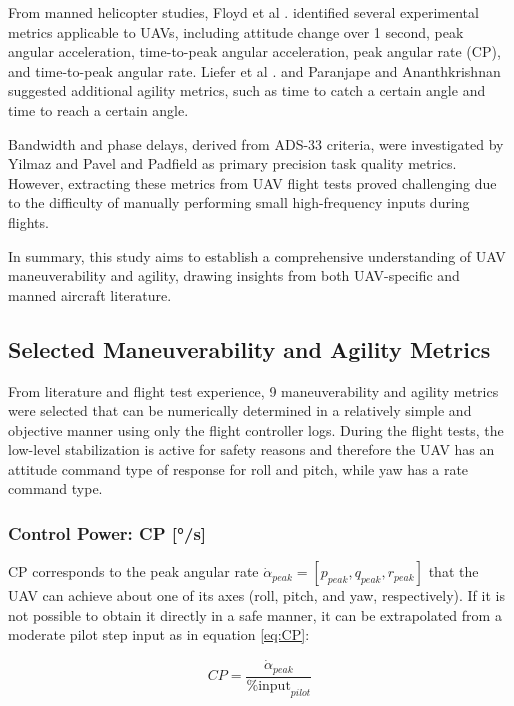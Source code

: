 From manned helicopter studies, Floyd et al \cite{Floyd1975}. identified several experimental metrics applicable to UAVs, including attitude change over 1 second, peak angular acceleration, time-to-peak angular acceleration, peak angular rate (CP), and time-to-peak angular rate. Liefer et al \cite{Liefer1992}. and Paranjape \cite{Paranjape2006} and Ananthkrishnan \cite{Paranjape2006} suggested additional agility metrics, such as time to catch a certain angle and time to reach a certain angle.

Bandwidth and phase delays, derived from ADS-33 criteria, were investigated by Yilmaz and Pavel \cite{Yilmaz2009} and Padfield \cite{Padfield2007} as primary precision task quality metrics. However, extracting these metrics from UAV flight tests proved challenging due to the difficulty of manually performing small high-frequency inputs during flights.

In summary, this study aims to establish a comprehensive understanding of UAV maneuverability and agility, drawing insights from both UAV-specific and manned aircraft literature.

\subsection{Selected Maneuverability and Agility Metrics}
\label{section:Selected Maneuverability}
From literature and flight test experience, 9 maneuverability and agility metrics were selected that can be numerically determined in a relatively simple and objective manner using only the flight controller logs. During the flight tests, the low-level stabilization is active for safety reasons and therefore the UAV has an attitude command type of response for roll and pitch, while yaw has a rate command type.

\subsubsection{Control Power: CP [°/s]}

CP corresponds to the peak angular rate \( \dot{\alpha}_{peak} = [ p_{peak}, q_{peak}, r_{peak} ] \) that the UAV can achieve about one of its axes (roll, pitch, and yaw, respectively). If it is not possible to obtain it directly in a safe manner, it can be extrapolated from a moderate pilot step input as in equation \ref{eq:CP}:

\begin{equation}
    CP = \frac{\dot{\alpha}_{peak}}{\% \text{input}_{pilot}} \label{eq:CP}
\end{equation}

